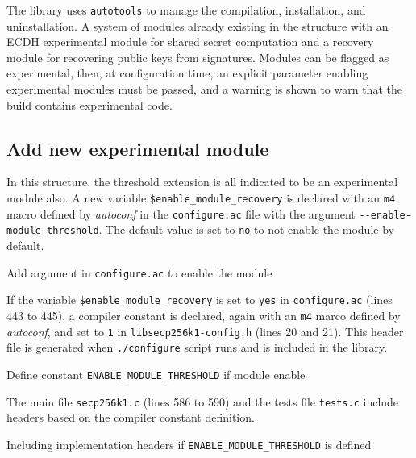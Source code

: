 The library uses \texttt{autotools} to manage the compilation, installation, and
uninstallation. A system of modules already existing in the structure with an
ECDH experimental module for shared secret computation and a recovery module for
recovering public keys from signatures. Modules can be flagged as experimental, then, at
configuration time, an explicit parameter enabling experimental modules must be
passed, and a warning is shown to warn that the build contains experimental
code.

\subsection{Add new experimental module}

In this structure, the threshold extension is all indicated to be an
experimental module also. A new variable \texttt{\$enable\_module\_recovery} is
declared with an \texttt{m4} macro defined by \textit{autoconf} in the \texttt{configure.ac} file
with the argument \texttt{-{}-enable-module-threshold}. The default value is set
to \texttt{no} to not enable the module by default.

\begin{listing}
	\caption{Add argument in \texttt{configure.ac} to enable the module}
	\label{lst:configureEnableThreshold}
\end{listing}

If the variable \texttt{\$enable\_module\_recovery} is set to \texttt{yes} in
\texttt{configure.ac} (lines 443 to 445), a compiler constant is declared, again
with an \texttt{m4} marco defined by \textit{autoconf}, and set to \texttt{1} in
\texttt{libsecp256k1-config.h} (lines 20 and 21). This header file is generated
when \texttt{./configure} script runs and is included in the library.

\begin{listing}
	\caption{Define constant \texttt{ENABLE\_MODULE\_THRESHOLD} if module enable}
	\label{lst:defineEnableThreshold}
\end{listing}

The main file \texttt{secp256k1.c} (lines 586 to 590) and the tests file
\texttt{tests.c} include headers based on the compiler constant definition.

\begin{listing}
	\caption{Including implementation headers if \texttt{ENABLE\_MODULE\_THRESHOLD} is
  defined}
	\label{lst:includeThresholdImplementationHeaders}
\end{listing}

